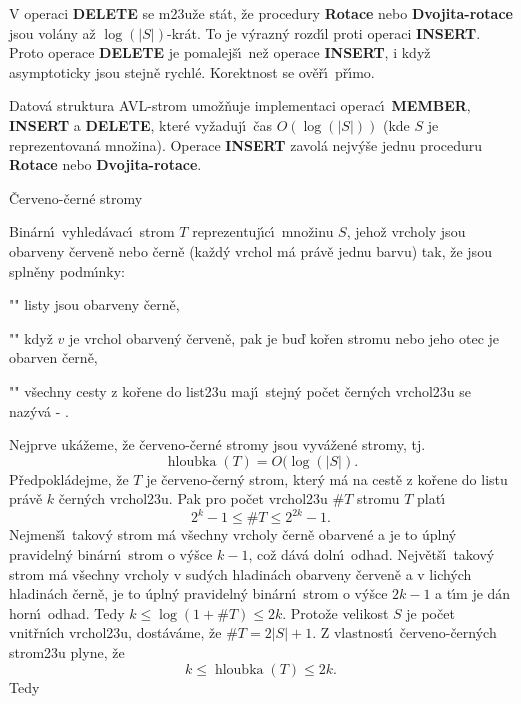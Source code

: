 \documentclass[a4paper,12pt]{article}
\def \emph#1{\underbar{#1}}
\DeclareMathOperator*{\hloubka}{hloubka}
\begin{document}
\flushpar V operaci {\bf DELETE} se m\accent23u\v ze st\'at, \v ze procedury 
{\bf Rotace} nebo {\bf Dvojita-rotace} jsou vol\'any a\v z $\log(
|S|)$-kr\'at. 
To je v\'yrazn\'y rozd\'\i l proti operaci {\bf INSERT}. Proto operace 
{\bf DELETE} je pomalej\v s\'\i\ ne\v z operace {\bf INSERT}, i kdy\v z 
asymptoticky jsou stejn\v e rychl\'e. Korektnost se 
ov\v e\v r\'\i\ p\v r\'\i mo.

Datov\'a struktura AVL-strom 
umo\v z\v nuje implementaci operac\'\i\ {\bf MEMBER}, {\bf INSERT} a 
{\bf DELETE}, kter\'e vy\v zaduj\'\i\ \v cas $O(\log(|S|))$ (kde $
S$ je 
reprezentovan\'a mno\v zina).  Ope\-race {\bf INSERT} zavol\'a 
nejv\'y\v se jednu proceduru {\bf Rotace} nebo {\bf Dvo\-ji\-ta-rotace}.  
\endproclaim
\medskip

\heading 
\v Cerveno-\v cern\'e stromy
\endheading

\flushpar Bin\'arn\'\i\ vyhled\'avac\'\i\ strom $T$ reprezentuj\'\i c\'\i\ 
mno\v zinu $S$, jeho\v z vrcholy jsou obarveny \v cerven\v e nebo 
\v cern\v e (ka\v zd\'y vrchol m\'a pr\'av\v e jednu barvu) tak, \v ze jsou 
spln\v eny podm\'\i nky:
\roster
\item"{}"
listy jsou obarveny \v cern\v e,
\item"{}"
kdy\v z $v$ je vrchol obarven\'y \v cerven\v e, pak je bu\v d ko\v ren 
stromu nebo jeho otec je obarven \v cern\v e,
\item"{}"
v\v sechny cesty z ko\v rene do list\accent23u maj\'\i\ stejn\'y 
po\v cet \v cer\-n\'ych vrchol\accent23u
\endroster
se naz\'yv\'a \emph{\v cerveno}-\emph{\v cern\'y} \emph{strom}. 
\medskip

\flushpar Nejprve uk\'a\v zeme, \v ze \v cerveno-\v cern\'e stromy jsou 
vyv\'a\v zen\'e stro\-my, tj. $$\hloubka(T)=O(\log(|S|).$$
P\v redpokl\'adejme, \v ze $T$ je \v cerveno-\v cern\'y strom, kter\'y m\'a 
na cest\v e z ko\v rene do listu pr\'av\v e $k$ \v cern\'ych 
vrchol\accent23u. Pak pro po\v cet vrchol\accent23u $\#T$ 
stromu $T$ plat\'\i\ 
$$2^k-1\le \#T\le 2^{2k}-1.$$
Nejmen\v s\'\i\ takov\'y strom m\'a v\v sechny vrcholy \v cern\v e 
obarven\'e a je to \'upln\'y pravideln\'y bin\'arn\'\i\ strom o 
v\'y\v sce $k-1$, co\v z d\'av\'a doln\'\i\ odhad.  Nejv\v et\v s\'\i\ takov\'y 
strom m\'a v\v sechny vrcholy v sud\'ych hladin\'ach obarveny 
\v cerven\v e a v lich\'ych hladin\'ach \v cern\v e, je to \'upln\'y 
pravideln\'y bin\'arn\'\i\ strom o v\'y\v sce $2k-1$ a t\'\i m je d\'an 
horn\'\i\ odhad. Tedy $k\le\log(1+\#T)\le 2k$.
Proto\v ze velikost $S$ je po\v cet vnit\v rn\'\i ch vrchol\accent23u, 
dost\'av\'ame, \v ze $\#T=2|S|+1$. Z vlastnost\'\i\ \v cerveno-\v cern\'ych 
strom\accent23u plyne, \v ze 
$$k\le\hloubka(T)\le 2k.$$
Tedy
\medskip
\end{document}
